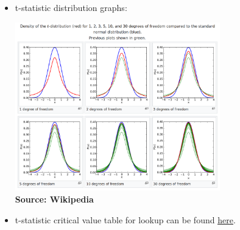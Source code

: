 \begin{itemize}
\begin{itemize}
\begin{itemize}
    \item t-statistic distribution graphs:

      \includegraphics[width=0.7\textwidth]{t_distributions_wikipedia.png}\\ [-1.5ex]
      {\fontsize{10}{0}\selectfont \textbf{Source: Wikipedia}}

    \item t-statistic critical value table for lookup can be found \underline{\href{https://www.ruf.rice.edu/~bioslabs/tools/stats/ttable.html}{here}}.
      

\end{itemize}
\end{itemize}
\end{itemize}
